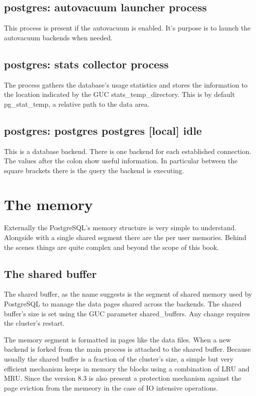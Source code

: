 \subsection{postgres: autovacuum launcher process}
This process is present if the autovacuum is enabled. It's purpose is to launch
the autovacuum backends when needed. 

\subsection{postgres: stats collector process}
The process gathers the database's usage statistics and stores the information to the location
indicated by the GUC stats\_temp\_directory. This is by default pg\_stat\_temp, a relative path to
the data area. 

\subsection{postgres: postgres postgres [local] idle}
This is a database backend. There is one backend for each established connection. The values after
the colon show useful information. In particular between the square brackets there is the query
the backend is executing. 

\section{The memory}
\label{sec:MEMORY}
Externally the PostgreSQL's memory structure is very simple to understand. Alongside with a single
shared segment there are the per user memories. Behind the scenes things are quite complex and
beyond the scope of this book.

\subsection{The shared buffer}
The shared buffer, as the name suggests is the segment of shared memory used by PostgreSQL to manage
the data pages shared across the backends. The shared buffer's size is set using the GUC parameter
shared\_buffers. Any change requires the cluster's restart.\newline

The memory segment is formatted in pages like the data files. When a new backend is forked
from the main process is attached to the shared buffer. Because usually the shared buffer is
a fraction of the cluster's size, a simple but very efficient mechanism keeps in memory the blocks
using a combination of LRU and MRU. Since the version 8.3 is also present a protection mechanism
against the page eviction from the memeory in the case of IO intensive  operations.\newline


